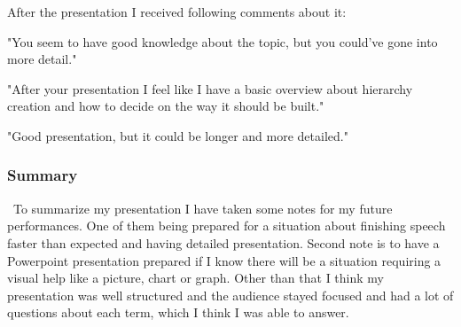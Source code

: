 After the presentation I received following comments about it:

"You seem to have good knowledge about the topic, but you could've gone into more detail."

"After your presentation I feel like I have a basic overview about hierarchy creation and how to decide on the way it should be built."

"Good presentation, but it could be longer and more detailed."

\subsubsection{Summary}\
To summarize my presentation I have taken some notes for my future performances. One of them being prepared for a situation about finishing speech faster than expected and having detailed presentation. Second note is to have a Powerpoint presentation prepared if I know there will be a situation requiring a visual help like a picture, chart or graph. 
Other than that I think my presentation was well structured and the audience stayed focused and had a lot of questions about each term, which I think I was able to answer.


